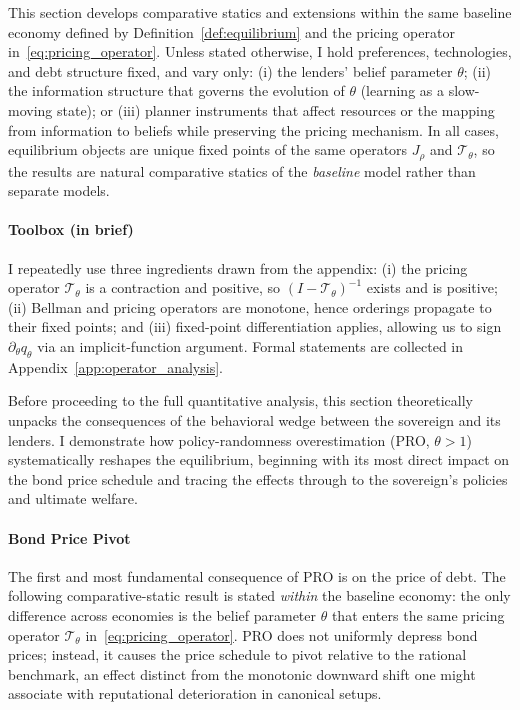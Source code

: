 \documentclass[12pt]{article}
\theoremstyle{plain}
\begin{document}
This section develops comparative statics and extensions within the same
baseline economy defined by Definition~\ref{def:equilibrium} and the pricing
operator in~\eqref{eq:pricing_operator}. Unless stated otherwise, I hold
preferences, technologies, and debt structure fixed, and vary only: (i) the
lenders' belief parameter $\theta$; (ii) the information structure that governs
the evolution of $\theta$ (learning as a slow-moving state); or (iii) planner
instruments that affect resources or the mapping from information to beliefs
while preserving the pricing mechanism. In all cases, equilibrium objects are
unique fixed points of the same operators $J_\rho$ and $\mathcal T_\theta$, so
the results are natural comparative statics of the \emph{baseline} model rather
than separate models.

\paragraph{Toolbox (in brief)}
I repeatedly use three ingredients drawn from the appendix: (i) the pricing
operator $\mathcal T_\theta$ is a contraction and positive, so $(I-\mathcal
	T_\theta)^{-1}$ exists and is positive; (ii) Bellman and pricing operators are
monotone, hence orderings propagate to their fixed points; and (iii)
fixed-point differentiation applies, allowing us to sign $\partial_\theta
	q_\theta$ via an implicit-function argument. Formal statements are collected in
Appendix~\ref{app:operator_analysis}.

Before proceeding to the full quantitative analysis, this section theoretically
unpacks the consequences of the behavioral wedge between the sovereign and its
lenders. I demonstrate how policy-randomness overestimation (PRO, $\theta > 1$)
systematically reshapes the equilibrium, beginning with its most direct impact
on the bond price schedule and tracing the effects through to the sovereign's
policies and ultimate welfare.

\paragraph{Bond Price Pivot}The first and most fundamental consequence of PRO is on the price of debt. The
following comparative-static result is stated \emph{within} the baseline
economy: the only difference across economies is the belief parameter $\theta$
that enters the same pricing operator $\mathcal T_\theta$
in~\eqref{eq:pricing_operator}. PRO does not uniformly depress bond prices;
instead, it causes the price schedule to pivot relative to the rational
benchmark, an effect distinct from the monotonic downward shift one might
associate with reputational deterioration in canonical setups.
\end{document}
